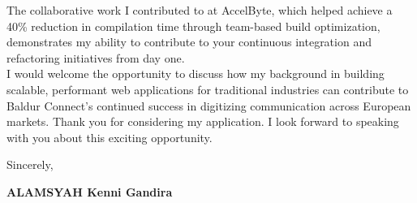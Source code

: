 \documentclass[12pt]{article}
\newcommand{\firstname}{Kenni Gandira}
\newcommand{\lastname}{Alamsyah}
\newcommand{\mainColor}{redBlood} %
\newlength{\spacebox}
\newcommand{\svspace}{\vspace*{0.5em}}
\newcommand{\signature}{
    \svspace
    \parbox{3\spacebox}{
      Sincerely,\par
      \svspace \hspace{-0.3em}
      \textbf{\color{\mainColor} \MakeUppercase{\lastname} \color{black} \firstname}\par
      \svspace \svspace
      \Huge \faPenNib\par
    }\par
}
\begin{document}
{  The collaborative work I contributed to at AccelByte, which helped achieve a 40\% reduction in compilation time through team-based build optimization, demonstrates my ability to contribute to your continuous integration and refactoring initiatives from day one. \\

}{I would welcome the opportunity to discuss how my background in building scalable, performant web applications for traditional industries can contribute to Baldur Connect's continued success in digitizing communication across European markets. Thank you for considering my application. I look forward to speaking with you about this exciting opportunity.}
\signature
\end{document}
